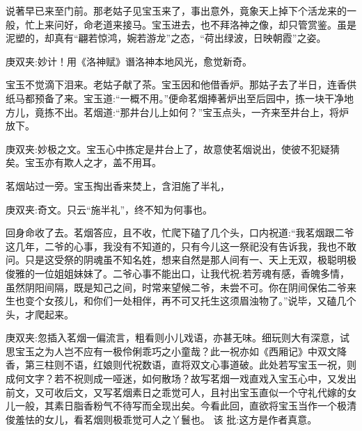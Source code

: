 \begin{parag}
    说著早已来至门前。那老姑子见宝玉来了，事出意外，竟象天上掉下个活龙来的一般，忙上来问好，命老道来接马。宝玉进去，也不拜洛神之像，却只管赏鉴。虽是泥塑的，却真有“翩若惊鸿，婉若游龙”之态，“荷出绿波，日映朝霞”之姿。\begin{note}庚双夹:妙计！用《洛神赋》谮洛神本地风光，愈觉新奇。\end{note}宝玉不觉滴下泪来。老姑子献了茶。宝玉因和他借香炉。那姑子去了半日，连香供纸马都预备了来。宝玉道:“一概不用。”便命茗烟捧著炉出至后园中，拣一块干净地方儿，竟拣不出。茗烟道:“那井台儿上如何？”宝玉点头，一齐来至井台上，将炉放下。\begin{note}庚双夹:妙极之文。宝玉心中拣定是井台上了，故意使茗烟说出，使彼不犯疑猜矣。宝玉亦有欺人之才，盖不用耳。\end{note}
\end{parag}


\begin{parag}
    茗烟站过一旁。宝玉掏出香来焚上，含泪施了半礼，\begin{note}庚双夹:奇文。只云“施半礼”，终不知为何事也。\end{note}回身命收了去。茗烟答应，且不收，忙爬下磕了几个头，口内祝道:“我茗烟跟二爷这几年，二爷的心事，我没有不知道的，只有今儿这一祭祀没有告诉我，我也不敢问。只是这受祭的阴魂虽不知名姓，想来自然是那人间有一、天上无双，极聪明极俊雅的一位姐姐妹妹了。二爷心事不能出口，让我代祝:若芳魂有感，香魄多情，虽然阴阳间隔，既是知己之间，时常来望候二爷，未尝不可。你在阴间保佑二爷来生也变个女孩儿，和你们一处相伴，再不可又托生这须眉浊物了。”说毕，又磕几个头，才爬起来。\begin{note}庚双夹:忽插入茗烟一偏流言，粗看则小儿戏语，亦甚无味。细玩则大有深意，试思宝玉之为人岂不应有一极伶俐乖巧之小童哉？此一祝亦如《西厢记》中双文降香，第三柱则不语，红娘则代祝数语，直将双文心事道破。此处若写宝玉一祝，则成何文字？若不祝则成一哑迷，如何散场？故写茗烟一戏直戏入宝玉心中，又发出前文，又可收后文，又写茗烟素日之乖觉可人，且衬出宝玉直似一个守礼代嫁的女儿一般，其素日脂香粉气不待写而全现出矣。今看此回，直欲将宝玉当作一个极清俊羞怯的女儿，看茗烟则极乖觉可人之丫鬟也。 该 批:这方是作者真意。\end{note}
\end{parag}


